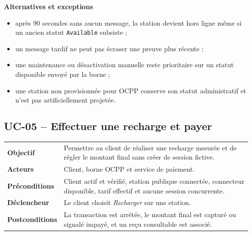 \textbf{Alternatives et exceptions}
\begin{itemize}[leftmargin=7mm]
  \item après 90 secondes sans aucun message, la station devient hors ligne même si
  un ancien statut \texttt{Available} subsiste ;
  \item un message tardif ne peut pas écraser une preuve plus récente ;
  \item une maintenance ou désactivation manuelle reste prioritaire sur un statut
  disponible envoyé par la borne ;
  \item une station non provisionnée pour OCPP conserve son statut administratif et
  n'est pas artificiellement projetée.
\end{itemize}

\subsection{UC-05 -- Effectuer une recharge et payer}

\begin{table}[H]
  \centering
  \begin{tabularx}{\textwidth}{@{}C{3.3cm}Y@{}}
    \toprule
    \textbf{Objectif} & Permettre au client de réaliser une recharge mesurée et de
    régler le montant final sans créer de session fictive.\\
    \textbf{Acteurs} & Client, borne OCPP et service de paiement.\\
    \textbf{Préconditions} & Client actif et vérifié, station publique connectée,
    connecteur disponible, tarif effectif et aucune session concurrente.\\
    \textbf{Déclencheur} & Le client choisit \emph{Recharger} sur une station.\\
    \textbf{Postconditions} & La transaction est arrêtée, le montant final est
    capturé ou signalé impayé, et un reçu consultable est associé.\\
    \bottomrule
  \end{tabularx}
\end{table}

